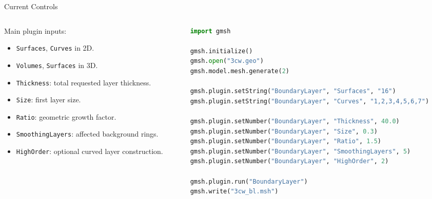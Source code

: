 \documentclass[
  12pt,
  handout,
  aspectratio=1610,
  mathserif
]{beamer}
\begin{document}
\begin{frame}[fragile]{Current Controls}
  \begin{columns}[T,totalwidth=\textwidth]
    \begin{column}{0.42\textwidth}
      Main plugin inputs:
      \begin{itemize}
        \item \texttt{Surfaces}, \texttt{Curves} in 2D.
        \item \texttt{Volumes}, \texttt{Surfaces} in 3D.
        \item \texttt{Thickness}: total requested layer thickness.
        \item \texttt{Size}: first layer size.
        \item \texttt{Ratio}: geometric growth factor.
        \item \texttt{SmoothingLayers}: affected background rings.
        \item \texttt{HighOrder}: optional curved layer construction.
      \end{itemize}
    \end{column}
    \begin{column}{0.55\textwidth}
      \begin{lstlisting}[language=Python]
import gmsh

gmsh.initialize()
gmsh.open("3cw.geo")
gmsh.model.mesh.generate(2)

gmsh.plugin.setString("BoundaryLayer", "Surfaces", "16")
gmsh.plugin.setString("BoundaryLayer", "Curves", "1,2,3,4,5,6,7")

gmsh.plugin.setNumber("BoundaryLayer", "Thickness", 40.0)
gmsh.plugin.setNumber("BoundaryLayer", "Size", 0.3)
gmsh.plugin.setNumber("BoundaryLayer", "Ratio", 1.5)
gmsh.plugin.setNumber("BoundaryLayer", "SmoothingLayers", 5)
gmsh.plugin.setNumber("BoundaryLayer", "HighOrder", 2)

gmsh.plugin.run("BoundaryLayer")
gmsh.write("3cw_bl.msh")
      \end{lstlisting}
    \end{column}
  \end{columns}
\end{frame}
\end{document}
